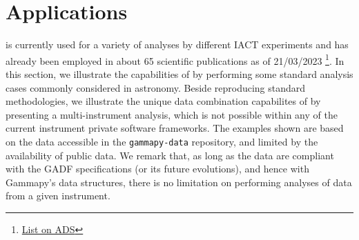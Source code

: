 \documentclass[longauth]{aa}
\newcommand{\code}[1]{\texttt{#1}}
\begin{document}
\section{Applications}
\label{sec:applications}
\gammapy is currently used for a variety of analyses by different IACT
experiments and has already been employed in about 65 scientific publications as of 21/03/2023
\footnote{\href{https://ui.adsabs.harvard.edu/search/q=(\%20(citations(doi\%3A\%2210.1051\%2F0004-6361\%2F201834938\%22)\%20OR\%20citations(bibcode\%3A2017ICRC...35..766D))\%20AND\%20year\%3A2014-2023)&sort=date\%20desc\%2C\%20bibcode\%20desc&p_=0}{List on ADS}}.
In this section, we illustrate the capabilities of \gammapy by performing some standard
analysis cases commonly considered in \gammaray astronomy.
Beside reproducing standard methodologies, we illustrate the unique data combination
capabilites of \gammapy by presenting a multi-instrument analysis, which is not possible within any
of the current instrument private software frameworks.
The examples shown are based on the data accessible in the \code{gammapy-data} repository,
and limited by the availability of public data.
We remark that, as long as the data are compliant with the GADF specifications (or its future evolutions),
and hence with Gammapy's data structures, there is no limitation on performing
analyses of data from a given instrument.
\end{document}
